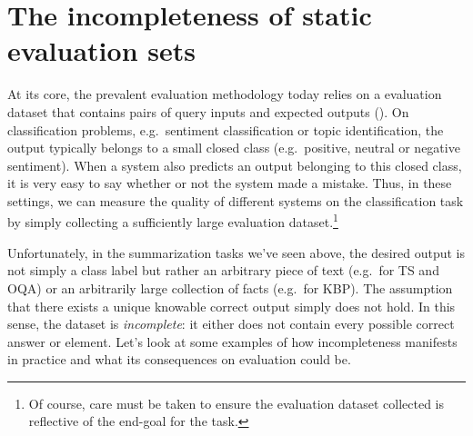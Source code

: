 \section{The incompleteness of static evaluation sets}
At its core, the prevalent evaluation methodology today relies on a evaluation dataset that contains pairs of query inputs and expected outputs ().
On classification problems, e.g.\ sentiment classification or topic identification, the output typically belongs to a small closed class (e.g.\ positive, neutral or negative sentiment).
When a system also predicts an output belonging to this closed class, it is very easy to say whether or not the system made a mistake.
Thus, in these settings, we can measure the quality of different systems on the classification task by simply collecting a sufficiently large evaluation dataset.\footnote{%
Of course, care must be taken to ensure the evaluation dataset collected is reflective of the end-goal for the task.}

Unfortunately, in the summarization tasks we've seen above, the desired output is not simply a class label but rather an arbitrary piece of text (e.g.\ for TS and OQA) or an arbitrarily large collection of facts (e.g.\ for KBP).
The assumption that there exists a unique knowable correct output simply does not hold.
In this sense, the dataset is \textit{incomplete}: it either does not contain every possible correct answer or element.
Let's look at some examples of how incompleteness manifests in practice and what its consequences on evaluation could be.

